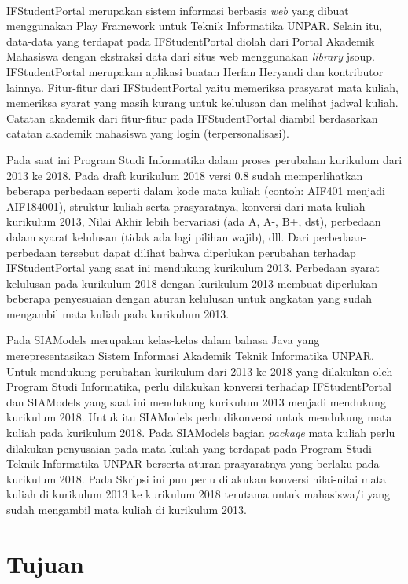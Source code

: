 \documentclass[a4paper,twoside]{article}
\begin{document}
\paragraph{} IFStudentPortal merupakan sistem informasi berbasis  \textit{web} yang dibuat menggunakan Play Framework untuk Teknik Informatika UNPAR. Selain itu, data-data yang terdapat pada IFStudentPortal diolah dari Portal Akademik Mahasiswa dengan ekstraksi data dari situs web menggunakan \textit{library} jsoup. IFStudentPortal merupakan aplikasi buatan Herfan Heryandi dan kontributor lainnya. Fitur-fitur dari IFStudentPortal yaitu memeriksa prasyarat mata kuliah, memeriksa syarat yang masih kurang untuk kelulusan dan melihat jadwal kuliah. Catatan akademik dari fitur-fitur pada IFStudentPortal diambil berdasarkan catatan akademik mahasiswa yang login (terpersonalisasi).

Pada saat ini Program Studi Informatika dalam proses perubahan kurikulum dari 2013 ke 2018. Pada draft kurikulum 2018 versi 0.8 sudah memperlihatkan beberapa perbedaan seperti dalam kode mata kuliah (contoh: AIF401 menjadi AIF184001), struktur kuliah serta prasyaratnya, konversi dari mata kuliah kurikulum 2013, Nilai Akhir lebih bervariasi (ada A, A-, B+, dst), perbedaan dalam syarat kelulusan (tidak ada lagi pilihan wajib), dll. Dari perbedaan-perbedaan tersebut dapat dilihat bahwa diperlukan perubahan terhadap IFStudentPortal yang saat ini mendukung kurikulum 2013. Perbedaan syarat kelulusan pada kurikulum 2018 dengan kurikulum 2013 membuat diperlukan beberapa penyesuaian dengan aturan kelulusan untuk angkatan yang sudah mengambil mata kuliah pada kurikulum 2013.

Pada SIAModels merupakan kelas-kelas dalam bahasa Java yang merepresentasikan Sistem Informasi Akademik Teknik Informatika UNPAR. Untuk mendukung perubahan kurikulum dari 2013 ke 2018 yang dilakukan oleh Program Studi Informatika, perlu dilakukan konversi terhadap IFStudentPortal dan SIAModels yang saat ini mendukung kurikulum 2013 menjadi mendukung kurikulum 2018.  Untuk itu SIAModels perlu dikonversi untuk mendukung mata kuliah pada kurikulum 2018. Pada SIAModels bagian \textit{package} mata kuliah perlu dilakukan penyusaian pada mata kuliah yang terdapat pada Program Studi Teknik Informatika UNPAR berserta aturan prasyaratnya yang berlaku pada kurikulum 2018. Pada Skripsi ini pun perlu dilakukan konversi nilai-nilai mata kuliah di kurikulum 2013 ke kurikulum 2018 terutama untuk mahasiswa/i yang sudah mengambil mata kuliah di kurikulum 2013.

\section{Tujuan}
\end{document}
